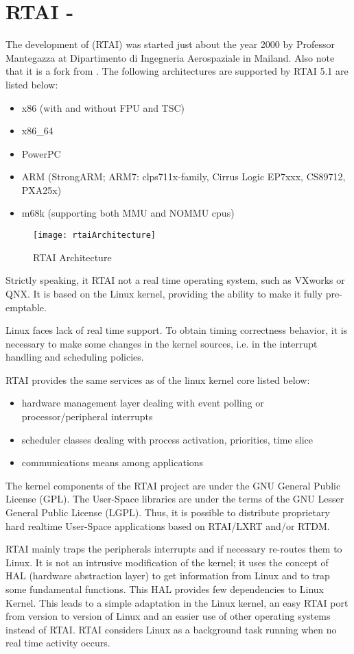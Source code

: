 \section{RTAI - \rtai}
The development of \rtai (RTAI) was started just about the year 2000 by Professor Mantegazza at Dipartimento di Ingegneria Aerospaziale in Mailand. Also note that it is a fork from \rtlinux. The following architectures are supported by RTAI 5.1 are listed below\cite{rtaiHomePage}:
\begin{itemize}
    \item x86 (with and without FPU and TSC)
    \item x86\_64
    \item PowerPC
    \item ARM (StrongARM; ARM7: clps711x-family, Cirrus Logic EP7xxx, CS89712, PXA25x)
    \item m68k (supporting both MMU and NOMMU cpus)
\end{itemize}
\begin{figure}[!htbp]
    \texttt{[image: rtaiArchitecture]}
    \caption{RTAI Architecture}\label{fig:rtai-architecture}
\end{figure}
Strictly speaking, it RTAI not a real time operating system, such as VXworks or QNX. It is based on the Linux kernel, providing the ability to make it fully pre-emptable.

Linux faces lack of real time support. To obtain timing correctness behavior, it is necessary to make some changes in the kernel sources, i.e. in the interrupt handling and scheduling policies. 

RTAI provides the same services as of the linux kernel core listed below:
\begin{itemize}
    \item hardware management layer dealing with event polling or processor/peripheral interrupts
    \item scheduler classes dealing with process activation, priorities, time slice
    \item communications means among applications
\end{itemize}

The kernel components of the RTAI project are under the GNU General Public License (GPL). The User-Space libraries are under the terms of the GNU Lesser General Public License (LGPL). Thus, it is possible to distribute proprietary hard realtime User-Space applications based on RTAI/LXRT and/or RTDM.

RTAI mainly traps the peripherals interrupts and if necessary re-routes them to Linux. It is not an intrusive modification of the kernel; it uses the concept of HAL (hardware abstraction layer) to get information from Linux and to trap some fundamental functions. This HAL provides few dependencies to Linux Kernel. This leads to a simple adaptation in the Linux kernel, an easy RTAI port from version to version of Linux and an easier use of other operating systems instead of RTAI. RTAI considers Linux as a background task running when no real time activity occurs.

